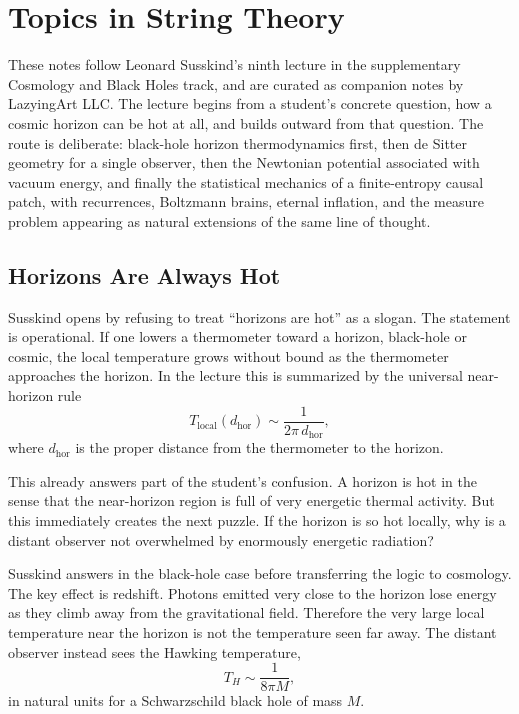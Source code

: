 \chapter{Topics in String Theory}

These notes follow Leonard Susskind's ninth lecture in the supplementary Cosmology and Black Holes track, and are curated as companion notes by LazyingArt LLC. The lecture begins from a student's concrete question, how a cosmic horizon can be hot at all, and builds outward from that question. The route is deliberate: black-hole horizon thermodynamics first, then de Sitter geometry for a single observer, then the Newtonian potential associated with vacuum energy, and finally the statistical mechanics of a finite-entropy causal patch, with recurrences, Boltzmann brains, eternal inflation, and the measure problem appearing as natural extensions of the same line of thought.

\section{Horizons Are Always Hot}

Susskind opens by refusing to treat ``horizons are hot'' as a slogan. The statement is operational. If one lowers a thermometer toward a horizon, black-hole or cosmic, the local temperature grows without bound as the thermometer approaches the horizon. In the lecture this is summarized by the universal near-horizon rule
\begin{equation}
T_{\text{local}}(d_{\text{hor}})\sim \frac{1}{2\pi\, d_{\text{hor}}},
\end{equation}
where \(d_{\text{hor}}\) is the proper distance from the thermometer to the horizon.

This already answers part of the student's confusion. A horizon is hot in the sense that the near-horizon region is full of very energetic thermal activity. But this immediately creates the next puzzle. If the horizon is so hot locally, why is a distant observer not overwhelmed by enormously energetic radiation?

Susskind answers in the black-hole case before transferring the logic to cosmology. The key effect is redshift. Photons emitted very close to the horizon lose energy as they climb away from the gravitational field. Therefore the very large local temperature near the horizon is not the temperature seen far away. The distant observer instead sees the Hawking temperature,
\begin{equation}
T_H \sim \frac{1}{8\pi M},
\end{equation}
in natural units for a Schwarzschild black hole of mass \(M\).

